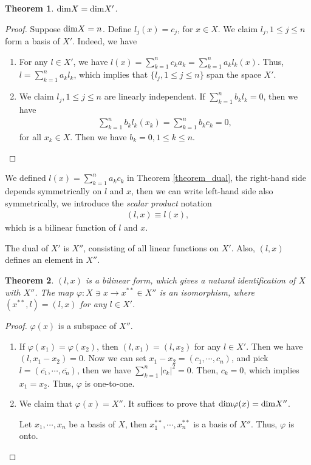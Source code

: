 \documentclass[10pt]{book}
\newtheorem{theorem}{Theorem}[chapter]
\theoremstyle{definition}
\numberwithin{equation}{chapter}
\begin{document}
\begin{theorem}
${\rm dim}X = {\rm dim}X'$.
\end{theorem}
\begin{proof}
Suppose ${\rm dim}X = n$. Define $l_j(x) = c_j$, for $x\in X$. We claim $l_j, 1\leq j\leq n$ form a basis of $X'$. Indeed, we have
\begin{enumerate}[label=(\alph*)]
    \item For any $l\in X'$, we have $l(x) = \sum^n_{k=1}c_k a_k = \sum^n_{k=1}a_k l_k(x)$. Thus, $l = \sum^n_{k=1}a_k l_k$, which implies that $\{l_j, 1\leq j\leq n\}$ span the space $X'$.
    \item We claim $l_j, 1\leq j\leq n$ are linearly independent. If $\sum^n_{k=1}b_k l_k = 0$, then we have 
    \begin{align*}
        \sum^n_{k=1}b_k l_k(x_k) = \sum^n_{k=1}b_k c_k = 0,
    \end{align*}
    for all $x_k\in X$. Then we have $b_k = 0, 1\leq k \leq n$.
\end{enumerate}
\end{proof}

\medskip

We defined $l(x) = \sum^n_{k=1} a_k c_k$ in Theorem \ref{theorem_dual}, the right-hand side depends symmetrically on $l$ and $x$, then we can write left-hand side also symmetrically, we introduce the \emph{scalar product} notation
\begin{align*}
    (l,x) \equiv l(x),
\end{align*}
which is a bilinear function of $l$ and $x$. 

The dual of $X'$ is $X''$, consisting of all linear functions on $X'$. Also, $(l,x)$ defines an element in $X''$.

\begin{theorem}\label{dual_identification_theorem}
$(l,x)$ is a bilinear form, which gives a natural identification of $X$ with $X''$. The map $\varphi:X\ni x \to x^{**}\in X''$ is an isomorphism, where $(x^{**},l) = (l,x)$ for any $l\in X'$.
\end{theorem}
\begin{proof}
$\varphi(x)$ is a subspace of $X''$.
\begin{enumerate}[label=(\alph*)]
    \item If $\varphi(x_1) = \varphi(x_2)$, then $(l,x_1) = (l,x_2)$ for any $l\in X'$. Then we have $(l,x_1 - x_2) = 0$. Now we can set $x_1 - x_2 = (c_1,\cdots,c_n)$, and pick $l = (\overline{c_1},\cdots,\overline{c_n})$, then we have $\sum^n_{k=1}|c_k|^2 = 0$. Then, $c_k = 0$, which implies $x_1 = x_2$. Thus, $\varphi$ is one-to-one.
    
    \item We claim that $\varphi(x) = X''$. It suffices to prove that ${\rm dim}\varphi(x) = {\rm dim}X''$.
    
    Let $x_1,\cdots,x_n$ be a basis of $X$, then $x_1^{**},\cdots,x_n^{**}$ is a basis of $X''$. Thus, $\varphi$ is onto.
\end{enumerate}
\end{proof}
\end{document}
